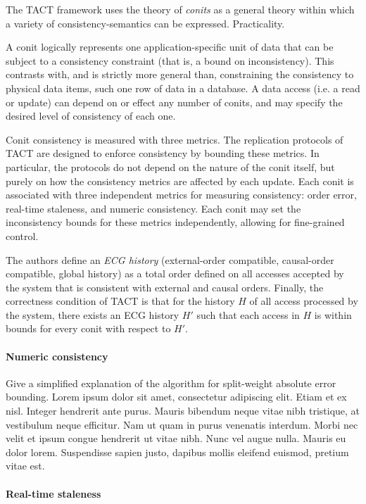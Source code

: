 The TACT framework uses the theory of
\emph{conits} as a general theory within which a variety of
consistency-semantics can be expressed. Practicality.

A conit logically represents one application-specific unit of data
that can be subject to a consistency constraint (that is, a bound on
inconsistency). This contrasts with, and is strictly more general
than, constraining the consistency to physical data items, such one
row of data in a database. A data access (i.e. a read or update) can
depend on or effect any number of conits, and may specify the desired
level of consistency of each one.

Conit consistency is measured with three metrics. The replication
protocols of TACT are designed to enforce consistency by bounding
these metrics. In particular, the protocols do not depend on the
nature of the conit itself, but purely on how the consistency metrics
are affected by each update. Each conit is associated with three
independent metrics for measuring consistency: order error, real-time
staleness, and numeric consistency. Each conit may set the
inconsistency bounds for these metrics independently, allowing for
fine-grained control.

The authors define an \emph{ECG history} (external-order compatible,
causal-order compatible, global history) as a total order defined on
all accesses accepted by the system that is consistent with external
and causal orders. Finally, the correctness condition of TACT is that
for the history $H$ of all access processed by the system, there
exists an ECG history $H'$ such that each access in $H$ is within
bounds for every conit with respect to $H'$.

\paragraph{Numeric consistency}

Give a simplified explanation of the algorithm for split-weight
absolute error bounding. Lorem ipsum dolor sit amet, consectetur
adipiscing elit. Etiam et ex nisl. Integer hendrerit ante
purus. Mauris bibendum neque vitae nibh tristique, at vestibulum neque
efficitur. Nam ut quam in purus venenatis interdum. Morbi nec velit et
ipsum congue hendrerit ut vitae nibh. Nunc vel augue nulla. Mauris eu
dolor lorem. Suspendisse sapien justo, dapibus mollis eleifend
euismod, pretium vitae est.

\paragraph{Real-time staleness}

